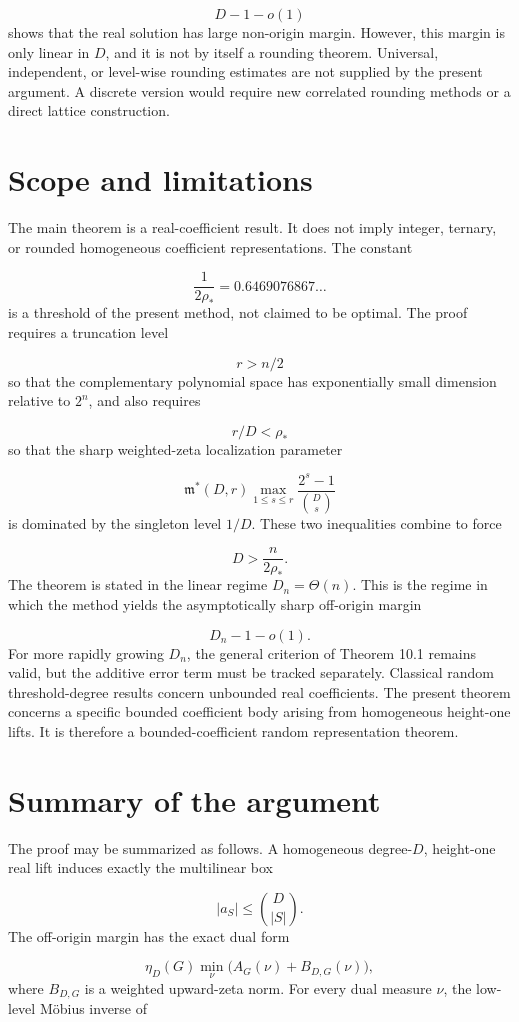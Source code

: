 \documentclass[11pt]{article}
\theoremstyle{definition}
\begin{document}
\[
D-1-o(1)
\]
shows that the real solution has large non-origin margin. However, this margin is only linear in $D$, and it is not by itself a rounding theorem. Universal, independent, or level-wise rounding estimates are not supplied by the present argument. A discrete version would require new correlated rounding methods or a direct lattice construction.

\section{Scope and limitations}
The main theorem is a real-coefficient result. It does not imply integer, ternary, or rounded homogeneous coefficient representations. The constant

\[
\frac1{2\rho_*}=0.6469076867\ldots
\]
is a threshold of the present method, not claimed to be optimal. The proof requires a truncation level

\[
r>n/2
\]
so that the complementary polynomial space has exponentially small dimension relative to $2^n$, and also requires

\[
r/D<\rho_*
\]
so that the sharp weighted-zeta localization parameter

\[
\mathfrak m^*(D,r)
\max_{1\le s\le r}
\frac{2^s-1}{\binom D s}
\]
is dominated by the singleton level $1/D$. These two inequalities combine to force

\[
D>\frac n{2\rho_*}.
\]
The theorem is stated in the linear regime $D_n=\Theta(n)$. This is the regime in which the method yields the asymptotically sharp off-origin margin

\[
D_n-1-o(1).
\]
For more rapidly growing $D_n$, the general criterion of Theorem 10.1 remains valid, but the additive error term must be tracked separately. Classical random threshold-degree results concern unbounded real coefficients. The present theorem concerns a specific bounded coefficient body arising from homogeneous height-one lifts. It is therefore a bounded-coefficient random representation theorem.

\section{Summary of the argument}
The proof may be summarized as follows. A homogeneous degree-$D$, height-one real lift induces exactly the multilinear box

\[
|a_S|\le \binom D{|S|}.
\]
The off-origin margin has the exact dual form

\[
\eta_D(G)
\min_\nu
\bigl(A_G(\nu)+B_{D,G}(\nu)\bigr),
\]
where $B_{D,G}$ is a weighted upward-zeta norm. For every dual measure $\nu$, the low-level Möbius inverse of
\end{document}
